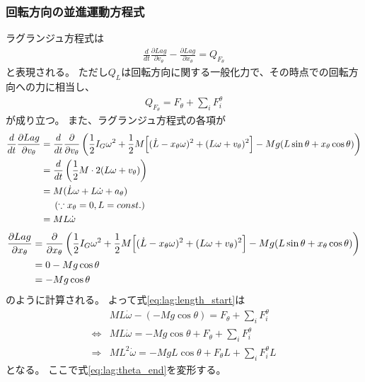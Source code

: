 \documentclass[a4paper,11pt]{jsarticle}
\begin{document}
\subsubsection*{回転方向の並進運動方程式}
ラグランジュ方程式は
\begin{align}
  \frac{d}{dt}\frac{\partial Lag}{\partial v_\theta} - \frac{\partial Lag}{\partial x_\theta} = Q_{F_\theta}
  \label{eq:lag:Ftheta_start}
\end{align}
と表現される。
ただし$Q_L$は回転方向に関する一般化力で、その時点での回転方向への力に相当し、
\begin{align}
  Q_{F_\theta} = F_\theta + \sum_i F_i^\theta
\end{align}
が成り立つ。
また、ラグランジュ方程式の各項が
\begin{align}
  \frac{d}{dt}\frac{\partial Lag}{\partial v_\theta}
  &= \frac{d}{dt}\frac{\partial }{\partial v_\theta}
  \left(
    \frac{1}{2}I_G\omega^2
    + \frac{1}{2}M
    \Bigl[ (\dot{L} - x_\theta \omega)^2 + (L\omega + v_\theta)^2 \Bigr]
    - Mg ( L\sin\theta + x_\theta \cos\theta )
  \right)
  \\
  & = \frac{d}{dt}\left( \frac{1}{2}M \cdot 2(L\omega + v_\theta )\right)
  \\
  &= M( \dot{L}\omega + L\dot\omega + a_\theta )
  \\
  & \ \ \ \ \left( \because x_\theta = 0, L = const. \right)
  \\
  &= M L \dot\omega
\end{align}
\begin{align}
  \frac{\partial Lag}{\partial x_\theta}
  &= \frac{\partial }{\partial x_\theta}
  \left(
    \frac{1}{2}I_G\omega^2
    + \frac{1}{2}M
    \Bigl[ (\dot{L} - x_\theta \omega)^2 + (L\omega + v_\theta)^2 \Bigr]
    - Mg ( L\sin\theta + x_\theta \cos\theta )
  \right)
  \\
  &= 0 - Mg\cos\theta
  \\
  &= - Mg\cos\theta
\end{align}
のように計算される。
よって式\ref{eq:lag:length_start}は
\begin{align}
  & M L \dot\omega - ( - Mg\cos\theta ) = F_\theta + \sum_i F_i^\theta
  \\
  \Leftrightarrow
  & M L \dot\omega = - Mg \cos\theta + F_\theta + \sum_i F_i^\theta
  \\
  \Rightarrow
  & M L^2 \dot\omega = - Mg L \cos\theta + F_\theta L + \sum_i F_i^\theta L
  \label{eq:lag:x_middle}
\end{align}
となる。
ここで式\ref{eq:lag:theta_end}を変形する。
\end{document}
